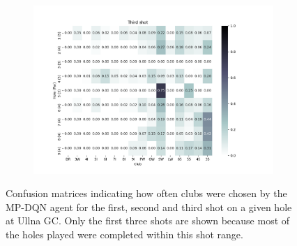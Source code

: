 \documentclass{kththesis}
\begin{document}
\begin{figure}
\begin{subfigure}{\textwidth}
    \includegraphics[height=0.3\textheight]{AgentClubChoices/MPDQN_Ullna_Club_Choices_Third_Shot.png} 
    \end{subfigure}
    \caption{Confusion matrices indicating how often clubs were chosen by the MP-DQN agent for the first, second and third shot on a given hole at Ullna GC. Only the first three shots are shown because most of the holes played were completed within this shot range.}
    \label{fig:MPDQN_ullna_club_choice_confusion}
\end{figure}
\end{document}
